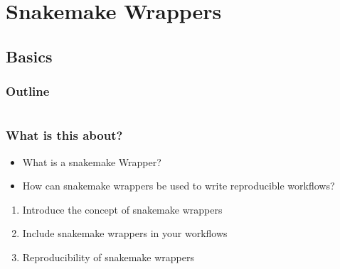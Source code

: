 \section{Snakemake Wrappers}

\subsection{Basics}

\begin{frame}
    \frametitle{Outline}
    \begin{columns}[t]
        \begin{column}{.5\textwidth}
            \tableofcontents[sections={1-9},currentsection]
        \end{column}
        \begin{column}{.5\textwidth}
            \tableofcontents[sections={10-18},currentsection]
        \end{column}
    \end{columns}
\end{frame}

\begin{frame}
    \frametitle{What is this about?}
    \begin{question}[Questions]
        \begin{itemize}
            \item What is a snakemake Wrapper?
            \item How can snakemake wrappers be used to write reproducible workflows?
        \end{itemize}
    \end{question}
    \begin{docs}[Objectives]
        \begin{enumerate}
            \item Introduce the concept of snakemake wrappers
            \item Include snakemake wrappers in your workflows
            \item Reproducibility of snakemake wrappers
        \end{enumerate}
    \end{docs}
\end{frame}


